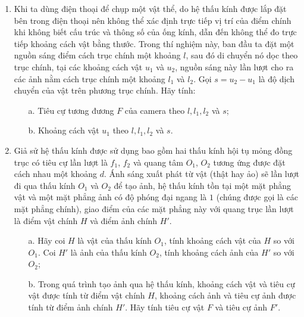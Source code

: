 \vspace{-20px}
\begin{enumerate}
  \item Khi ta dùng điện thoại để chụp một vật thể, do hệ thấu kính được lắp đặt bên trong điện thoại nên không thể xác định trực tiếp vị trí của điểm chính khi không biết cấu trúc và thông số của ống kính, dẫn đến không thể đo trực tiếp khoảng cách vật bằng thước. Trong thí nghiệm này, ban đầu ta đặt một nguồn sáng điểm cách trục chính một khoảng $l$, sau đó di chuyển nó dọc theo trục chính, tại các khoảng cách vật $u_{1}$ và $u_{2}$, nguồn sáng này lần lượt cho ra các ảnh nằm cách trục chính một khoảng $l_{1}$ và $l_{2}$. Gọi $s=u_{2}-u_{1}$ là độ dịch chuyển của vật trên phương trục chính. Hãy tính:
        \begin{enumerate}
          \item[a.] Tiêu cự tương đương $F$ của camera theo $l, l_{1}, l_{2}$ và $s$;
          \item[b.] Khoảng cách vật $u_{1}$ theo $l, l_{1}, l_{2}$ và $s$.
        \end{enumerate}
  \item Giả sử hệ thấu kính được sử dụng bao gồm hai thấu kính hội tụ mỏng đồng trục có tiêu cự lần lượt là $f_{1}$, $f_{2}$ và quang tâm $O_{1}$, $O_{2}$ tương ứng được đặt cách nhau một khoảng $d$. Ánh sáng xuất phát từ vật (thật hay ảo) sẽ lần lượt đi qua thấu kính $O_{1}$ và $O_{2}$ để tạo ảnh, hệ thấu kính tồn tại một mặt phẳng vật và một mặt phẳng ảnh có độ phóng đại ngang là $1$ (chúng được gọi là các mặt phẳng chính), giao điểm của các mặt phẳng này với quang trục lần lượt là điểm vật chính $H$ và điểm ảnh chính $H'$.
        \begin{enumerate}
          \item[a.] Hãy coi $H$ là vật của thấu kính $O_{1}$, tính khoảng cách vật của $H$ so với $O_{1}$. Coi $H'$ là ảnh của thấu kính $O_{2}$, tính khoảng cách ảnh của $H'$ so với $O_{2}$;
          \item[b.] Trong quá trình tạo ảnh qua hệ thấu kính, khoảng cách vật và tiêu cự vật được tính từ điểm vật chính $H$, khoảng cách ảnh và tiêu cự ảnh được tính từ điểm ảnh chính $H'$. Hãy tính tiêu cự vật $F$ và tiêu cự ảnh $F'$.
        \end{enumerate}
\end{enumerate}

